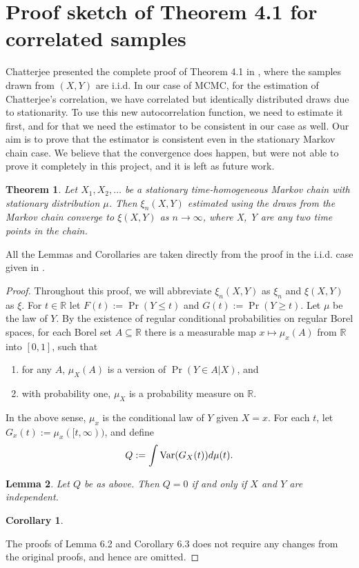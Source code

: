 \documentclass{article}
\newtheorem{theorem}{Theorem}[section]
\newtheorem{corollary}{Corollary}[theorem]
\newtheorem{lemma}[theorem]{Lemma}
\begin{document}
\section{Proof sketch of Theorem 4.1 for correlated samples}
	Chatterjee presented the complete proof of Theorem 4.1 in \cite{chatterjee2020sourav}, where the samples drawn from $(X, Y)$ are i.i.d.
	In our case of MCMC, for the estimation of Chatterjee's correlation, we have correlated but identically distributed draws due to stationarity.
	To use this new autocorrelation function, we need to estimate it first, and for that we need the estimator to be consistent in our case as well.
	Our aim is to prove that the estimator is consistent even in the stationary Markov chain case.
	We believe that the convergence does happen, but were not able to prove it completely in this project, and it is left as future work.

	\begin{theorem}
		Let $X_1, X_2, \dots$ be a stationary time-homogeneous Markov chain with stationary distribution $\mu$.
		Then $\xi_n(X, Y)$ estimated using the draws from the Markov chain converge to $\xi(X, Y)$ as $n \rightarrow \infty$, where X, Y are any two time points in the chain.
	\end{theorem}
	All the Lemmas and Corollaries are taken directly from the proof in the i.i.d. case given in \cite{chatterjee2020sourav}.
	\begin{proof}
		Throughout this proof, we will abbreviate $\xi_n(X, Y)$ as $\xi_n$ and $\xi(X, Y)$ as $\xi$.
		For $t \in \mathbb{R}$ let $F(t) := \Pr(Y \leq t)$ and $G(t) := \Pr(Y \geq t)$. Let $\mu$ be the law of $Y$.
		By the existence of regular conditional probabilities on regular Borel spaces, for each Borel set $A \subseteq \mathbb{R}$ there is a measurable map $x \mapsto \mu_x(A)$ from $\mathbb{R}$ into $[0, 1]$, such that
		\begin{enumerate}
			\item for any $A$, $\mu_X(A)$ is a version of $\Pr(Y \in A|X)$, and
			\item with probability one, $\mu_X$ is a probability measure on $\mathbb{R}$.
		\end{enumerate}
		In the above sense, $\mu_x$ is the conditional law of $Y$ given $X = x$. For each $t$, let $G_x(t) := \mu_x([t, \infty))$, and define
		$$Q := \int \text{Var}(G_X(t))d\mu(t).$$
		\begin{lemma}
			Let $Q$ be as above. Then $Q = 0$ if and only if $X$ and $Y$ are independent.
		\end{lemma}
		\begin{corollary}

		\end{corollary}
		The proofs of Lemma 6.2 and Corollary 6.3 does not require any changes from the original proofs, and hence are omitted.

	\end{proof}
\end{document}
